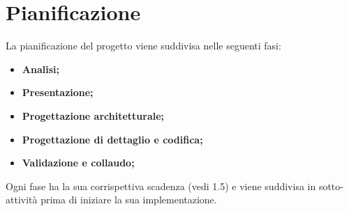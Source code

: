 \section{Pianificazione}

La pianificazione del progetto viene suddivisa nelle seguenti fasi:
\begin{itemize}
	\item \textbf{Analisi;}
	\item \textbf{Presentazione;}
	\item \textbf{Progettazione architetturale;}
	\item \textbf{Progettazione di dettaglio e codifica;}
	\item \textbf{Validazione e collaudo;}
\end{itemize}
Ogni fase ha la sua corrispettiva scadenza (vedi 1.5) e viene suddivisa in sotto-attività prima di iniziare la sua implementazione.
